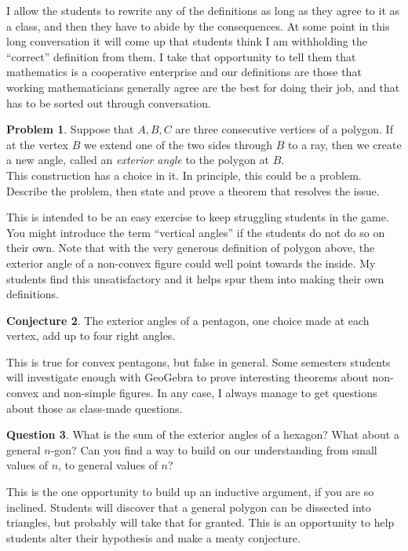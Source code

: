 \documentclass{tufte-handout}
\theoremstyle{definition}
\newtheorem{problem}{Problem}[section]
\newtheorem{conjecture}[problem]{Conjecture}
\newtheorem{question}[problem]{Question}
\begin{document}
I allow the students to rewrite any of the definitions as long as they agree to it as a class, and then they have to abide by the consequences. At some point in this long conversation it will come up that students think I am withholding the ``correct'' definition from them. I take that opportunity to tell them that mathematics is a cooperative enterprise and our definitions are those that working mathematicians generally agree are the best for doing their job, and that has to be sorted out through conversation. 

\begin{problem}\label{prob:exterior-angle}
Suppose that $A,B,C$ are three consecutive vertices of a polygon. 
If at the vertex $B$ we extend one of the two sides through $B$ to a ray, then we create a new angle, called an \emph{exterior angle} to the polygon at $B$.\\
This construction has a choice in it. 
In principle, this could be a problem. 
Describe the problem, then state and prove a theorem that resolves the issue.
\end{problem}

This is intended to be an easy exercise to keep struggling students in the game. You might introduce the term ``vertical angles'' if the students do not do so on their own. Note that with the very generous definition of polygon above, the exterior angle of a non-convex figure could well point towards the inside. My students 
find this unsatisfactory and it helps spur them into making their own definitions.


\begin{conjecture}\label{conj:ext-angles-pentagon}
The exterior angles of a pentagon, one choice made at each vertex, add up to four right angles.
\end{conjecture}

This is true for convex pentagons, but false in general. Some semesters students will investigate enough with GeoGebra to 
prove interesting theorems about non-convex and non-simple figures. In any case, I always manage to get questions about those as class-made questions.

\begin{question}\label{question-induction}
What is the sum of the exterior angles of a hexagon? 
What about a general $n$-gon? 
Can you find a way to build on our understanding from small values of $n$, to general values of $n$?
\end{question}

This is the one opportunity to build up an inductive argument, if you are so inclined. Students will discover that a general polygon can be dissected into triangles, but probably will take that for granted. This is an opportunity to help students alter their hypothesis and make a meaty conjecture. 
\end{document}
